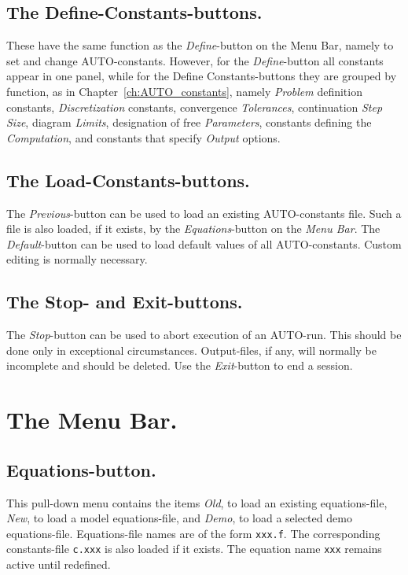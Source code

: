\documentclass[12pt]{report}
\begin{document}
\subsection{ The Define-Constants-buttons.}
These have the same function as
the {\it Define}-button on the  Menu Bar, namely to set and change
{\cal AUTO}-constants.
However, 
for the {\it Define}-button all constants appear in one panel, 
while 
for the Define Constants-buttons they
are grouped by function, 
as in Chapter~\ref{ch:AUTO_constants}, namely
{\it Problem} definition constants,
{\it Discretization} constants,
convergence {\it Tolerances},
continuation {\it Step Size},
diagram {\it Limits},
designation of free {\it Parameters},
constants defining the {\it Computation},
and
constants that specify {\it Output} options.


\subsection{ The Load-Constants-buttons.}
The {\it Previous}-button can be used to load an existing {\cal AUTO}-constants file.
Such a file is also loaded, if it exists,
by the {\it Equations}-button on the {\it Menu Bar}.
The {\it Default}-button can be used
to load  default values of all {\cal AUTO}-constants. 
Custom editing is normally necessary.


\subsection{ The Stop- and Exit-buttons.}
The {\it Stop}-button can be used to abort execution of an {\cal AUTO}-run.
This should be done only in exceptional circumstances.
Output-files, if any, will normally be incomplete and should be deleted.
Use the {\it Exit}-button to end a session.


\section{ The Menu Bar.} \label{sec:GUI_Menu_bar}
\subsection{ Equations-button.}
This pull-down menu contains the items
{\it Old}, to load an existing equations-file,
{\it New}, to load a model equations-file,
and
{\it Demo}, to load a selected demo equations-file.
Equations-file names are of the form {\tt xxx.f}.
The corresponding constants-file {\tt c.xxx} is also loaded if it exists.
The equation name {\tt xxx} remains active until redefined.
\end{document}
